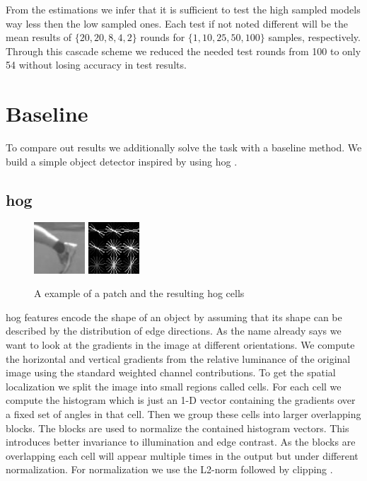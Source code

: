 From the estimations  we infer that it is sufficient to test the high sampled models way less then the low sampled ones. Each test if not noted different will be the mean results of $\{20, 20, 8, 4, 2\}$ rounds for $\{1, 10, 25, 50, 100\}$ samples, respectively. Through this cascade scheme we reduced the needed test rounds from 100 to only 54 without losing accuracy in test results.

\clearpage
\section{Baseline}
\label{sec:results:baseline}
To compare out results we additionally solve the task with a baseline method. We build a simple object detector inspired by \citet{felzenszwalb_object_2010} using \acrfull{hog} \citep{dalal_histograms_2005}.\\

\subsection{\Gls{hog}}
\begin{figure}
  \vspace{-25pt}
  \begin{center}
    \includegraphics[width=0.17\textwidth]{figures/hog_image.png}
    \includegraphics[width=0.17\textwidth]{figures/hog_feature.png}
  \end{center}
  \vspace{-5pt}
  \caption{A example of a patch and  the resulting \gls{hog} cells}
  \vspace{-10pt}
  \label{fig:hog}
\end{figure}
\gls{hog} features encode the shape of an object by assuming that its shape can be described by the distribution of edge directions. As the name already says we want to look at the gradients in the image at different orientations. We compute the horizontal and vertical gradients from the relative luminance of the original image using the standard weighted channel contributions. To get the spatial localization we split the image into small regions called cells. For each cell we compute the histogram which is just an 1-D vector containing the gradients over a fixed set of angles in that cell. Then we group these cells into larger overlapping blocks. The blocks are used to normalize the contained histogram vectors. This introduces better invariance to illumination and edge contrast. As the blocks are overlapping each cell will appear multiple times in the output but under different normalization. For normalization we use the L2-norm followed by clipping \citep{lowe_distinctive_2004}.

